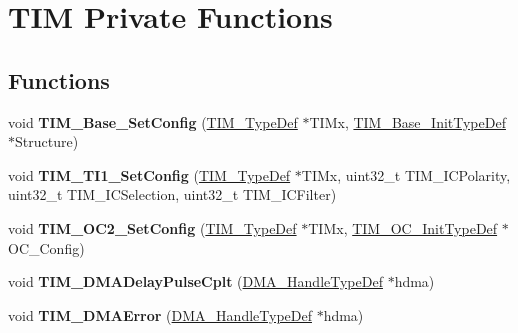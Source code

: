\hypertarget{group___t_i_m___private___functions}{}\section{T\+IM Private Functions}
\label{group___t_i_m___private___functions}
\subsection*{Functions}
\begin{DoxyCompactItemize}
\item 
void {\bfseries T\+I\+M\+\_\+\+Base\+\_\+\+Set\+Config} (\hyperlink{struct_t_i_m___type_def}{T\+I\+M\+\_\+\+Type\+Def} $\ast$T\+I\+Mx, \hyperlink{struct_t_i_m___base___init_type_def}{T\+I\+M\+\_\+\+Base\+\_\+\+Init\+Type\+Def} $\ast$Structure)\hypertarget{group___t_i_m___private___functions_ga057e4b4da135186e8fb88327c5fd0684}{}\label{group___t_i_m___private___functions_ga057e4b4da135186e8fb88327c5fd0684}

\item 
void {\bfseries T\+I\+M\+\_\+\+T\+I1\+\_\+\+Set\+Config} (\hyperlink{struct_t_i_m___type_def}{T\+I\+M\+\_\+\+Type\+Def} $\ast$T\+I\+Mx, uint32\+\_\+t T\+I\+M\+\_\+\+I\+C\+Polarity, uint32\+\_\+t T\+I\+M\+\_\+\+I\+C\+Selection, uint32\+\_\+t T\+I\+M\+\_\+\+I\+C\+Filter)\hypertarget{group___t_i_m___private___functions_ga83c847710a92f0558c862dd0dc889ff3}{}\label{group___t_i_m___private___functions_ga83c847710a92f0558c862dd0dc889ff3}

\item 
void {\bfseries T\+I\+M\+\_\+\+O\+C2\+\_\+\+Set\+Config} (\hyperlink{struct_t_i_m___type_def}{T\+I\+M\+\_\+\+Type\+Def} $\ast$T\+I\+Mx, \hyperlink{struct_t_i_m___o_c___init_type_def}{T\+I\+M\+\_\+\+O\+C\+\_\+\+Init\+Type\+Def} $\ast$O\+C\+\_\+\+Config)\hypertarget{group___t_i_m___private___functions_ga20370137a5c000fa4739d30669e67b8c}{}\label{group___t_i_m___private___functions_ga20370137a5c000fa4739d30669e67b8c}

\item 
void {\bfseries T\+I\+M\+\_\+\+D\+M\+A\+Delay\+Pulse\+Cplt} (\hyperlink{group___d_m_a___exported___types_ga41b754a906b86bce54dc79938970138b}{D\+M\+A\+\_\+\+Handle\+Type\+Def} $\ast$hdma)\hypertarget{group___t_i_m___private___functions_ga78edd2f05a873d68690d8658aa427ccf}{}\label{group___t_i_m___private___functions_ga78edd2f05a873d68690d8658aa427ccf}

\item 
void {\bfseries T\+I\+M\+\_\+\+D\+M\+A\+Error} (\hyperlink{group___d_m_a___exported___types_ga41b754a906b86bce54dc79938970138b}{D\+M\+A\+\_\+\+Handle\+Type\+Def} $\ast$hdma)\hypertarget{group___t_i_m___private___functions_gaa112bee5279feee040c1ea9e283f7378}{}\label{group___t_i_m___private___functions_gaa112bee5279feee040c1ea9e283f7378}


\end{DoxyCompactItemize}
